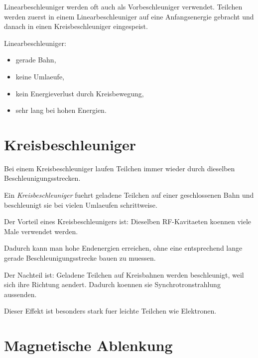 \begin{notebox}
Linearbeschleuniger werden oft auch als Vorbeschleuniger verwendet.
Teilchen werden zuerst in einem Linearbeschleuniger auf eine Anfangsenergie gebracht
und danach in einen Kreisbeschleuniger eingespeist.
\end{notebox}

\begin{examtipbox}
Linearbeschleuniger:
\begin{itemize}
    \item gerade Bahn,
    \item keine Umlaeufe,
    \item kein Energieverlust durch Kreisbewegung,
    \item sehr lang bei hohen Energien.
\end{itemize}
\end{examtipbox}

\section{Kreisbeschleuniger}

Bei einem Kreisbeschleuniger laufen Teilchen immer wieder durch dieselben
Beschleunigungsstrecken.

\begin{definitionbox}
Ein \emph{Kreisbeschleuniger} fuehrt geladene Teilchen auf einer geschlossenen
Bahn und beschleunigt sie bei vielen Umlaeufen schrittweise.
\end{definitionbox}

\begin{conceptbox}
Der Vorteil eines Kreisbeschleunigers ist:
Dieselben RF-Kavitaeten koennen viele Male verwendet werden.

Dadurch kann man hohe Endenergien erreichen, ohne eine entsprechend lange gerade
Beschleunigungsstrecke bauen zu muessen.
\end{conceptbox}

\begin{conceptbox}
Der Nachteil ist:
Geladene Teilchen auf Kreisbahnen werden beschleunigt, weil sich ihre Richtung
aendert.
Dadurch koennen sie Synchrotronstrahlung aussenden.

Dieser Effekt ist besonders stark fuer leichte Teilchen wie Elektronen.
\end{conceptbox}

\section{Magnetische Ablenkung}

